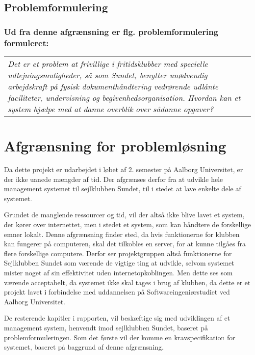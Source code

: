 \subsection*{Problemformulering}
\subsubsection*{Ud fra denne afgrænsning er flg. problemformulering formuleret:}

\begin{center}
  \begin{tabular}{|p{14cm}|}
    \textit{Det er et problem at frivillige i fritidsklubber med specielle udlejningsmuligheder, så som Sundet, benytter unødvendig arbejdskraft på fysisk dokumenthåndtering vedrørende udlånte faciliteter, undervisning og begivenhedsorganisation. Hvordan kan et system hjælpe med at danne overblik over sådanne opgaver?}
  \end{tabular}
\end{center}


\section{Afgrænsning for problemløsning}

Da dette projekt er udarbejdet i løbet af 2. semester på Aalborg Universitet, er der ikke uanede mængder af tid. Der afgrænses derfor fra at udvikle hele management systemet til sejlklubben Sundet, til i stedet at lave enkelte dele af systemet.

Grundet de manglende ressourcer og tid, vil der altså ikke blive lavet et system, der kører over internettet,
men i stedet et system, som kan håndtere de forskellige emner lokalt. 
Denne afgrænsning finder sted, da hvis funktionerne for klubben kan fungerer på computeren, skal det tilkobles en server, for at kunne
tilgåes fra flere forskellige computere.
Derfor ser projektgruppen altså funktionerne for Sejlklubben Sundet som værende de vigtige ting at udvikle, selvom systemet mister noget af sin effektivitet uden internetopkoblingen. 
Men dette ses som værende acceptabelt, da systemet ikke skal tages i brug af klubben, da dette er et projekt lavet i forbindelse med uddannelsen på Softwareingeniørstudiet ved Aalborg Universitet.

De resterende kapitler i rapporten, vil beskæftige sig med udviklingen af et management system, henvendt imod
sejlklubben Sundet, baseret på problemformuleringen. Som det første vil der komme en kravspecifikation for
systemet, baseret på baggrund af denne afgrænsning.
